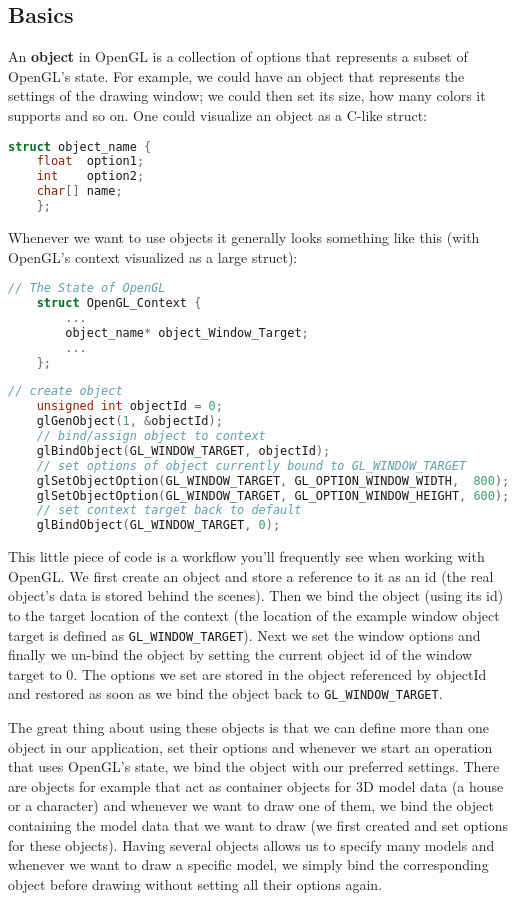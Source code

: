 \subsection{Basics}
An \textbf{object} in OpenGL is a collection of options that represents a subset of OpenGL's state. For example, we could have an object that represents the settings of the drawing window; we could then set its size, how many colors it supports and so on. One could visualize an object as a C-like struct:
\begin{lstlisting}[language=C++]
    struct object_name {
    float  option1;
    int    option2;
    char[] name;
    };
\end{lstlisting}

Whenever we want to use objects it generally looks something like this (with OpenGL's context visualized as a large struct):
\begin{lstlisting}[language=C++]
    // The State of OpenGL
    struct OpenGL_Context {
      	...
      	object_name* object_Window_Target;
      	...  	
    };
\end{lstlisting}

\begin{lstlisting}[language=C++]
    // create object
    unsigned int objectId = 0;
    glGenObject(1, &objectId);
    // bind/assign object to context
    glBindObject(GL_WINDOW_TARGET, objectId);
    // set options of object currently bound to GL_WINDOW_TARGET
    glSetObjectOption(GL_WINDOW_TARGET, GL_OPTION_WINDOW_WIDTH,  800);
    glSetObjectOption(GL_WINDOW_TARGET, GL_OPTION_WINDOW_HEIGHT, 600);
    // set context target back to default
    glBindObject(GL_WINDOW_TARGET, 0);
\end{lstlisting}

This little piece of code is a workflow you'll frequently see when working with OpenGL. We first create an object and store a reference to it as an id (the real object's data is stored behind the scenes). Then we bind the object (using its id) to the target location of the context (the location of the example window object target is defined as \verb|GL_WINDOW_TARGET|). Next we set the window options and finally we un-bind the object by setting the current object id of the window target to 0. The options we set are stored in the object referenced by objectId and restored as soon as we bind the object back to \verb|GL_WINDOW_TARGET|.

The great thing about using these objects is that we can define more than one object in our application, set their options and whenever we start an operation that uses OpenGL's state, we bind the object with our preferred settings. There are objects for example that act as container objects for 3D model data (a house or a character) and whenever we want to draw one of them, we bind the object containing the model data that we want to draw (we first created and set options for these objects). Having several objects allows us to specify many models and whenever we want to draw a specific model, we simply bind the corresponding object before drawing without setting all their options again.